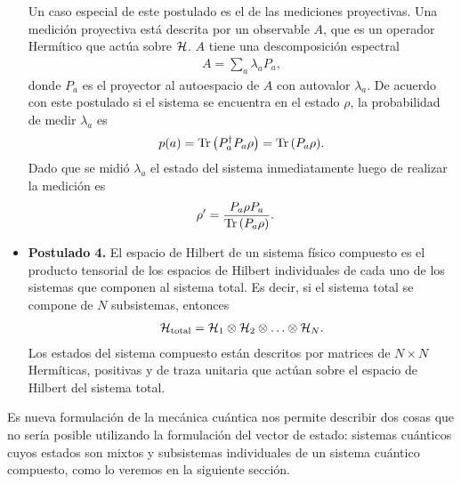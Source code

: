\begin{itemize}
	Un caso especial de este postulado es el de las mediciones proyectivas.
	Una medición proyectiva está descrita por un observable
	$A$, que es un operador Hermítico que actúa sobre $\mathcal{H}$. $A$ tiene una
	descomposición espectral 
	\begin{align}
		A = \sum _a \lambda_aP_a,
	\end{align}
	donde $P_a$ es el proyector al autoespacio de $A$ con autovalor $\lambda_a$.
	De acuerdo con este postulado si el sistema se encuentra en el estado
	$\rho$, la probabilidad de medir $\lambda_a$ es
	\begin{align}
		p(a) = \Tr \qty(P_a^{\dagger}P_a\rho) = \Tr \qty(P_a\rho).
	\end{align}
	Dado que se midió $\lambda_a$ el estado del sistema inmediatamente 
	luego de realizar la medición es 
	\begin{align}
		\rho'&=\frac{P_a\rho P_a}{\Tr \qty(P_a \rho)}.
	\end{align}
	\item[] \textbf{Postulado 4.} El espacio de Hilbert de un sistema físico 
	compuesto es el producto tensorial de los espacios de Hilbert 
	individuales de cada uno de los sistemas que componen al sistema total.
	Es decir, si el sistema total se compone de $N$ subsistemas, entonces
	\begin{align}
		\mathcal{H}_{\text{total}} = \mathcal{H}_1\otimes \mathcal{H}_2 \otimes \ldots \otimes \mathcal{H}_N.
	\end{align}
	Los estados del sistema compuesto están descritos por matrices de 
$N\times N$ Hermíticas, positivas y de traza unitaria que actúan 
sobre el espacio de Hilbert del sistema total.
\end{itemize}

Es nueva formulación de la mecánica cuántica nos permite describir
dos cosas que no sería posible utilizando la formulación del 
vector de estado:
sistemas cuánticos cuyos estados son mixtos y
subsistemas individuales de un sistema cuántico compuesto, como lo veremos
en la siguiente sección. 

